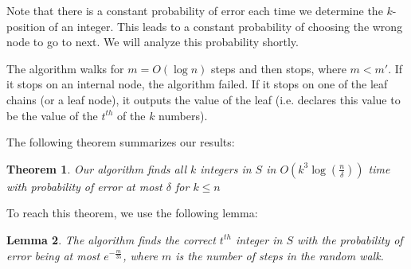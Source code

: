 \documentclass[12pt]{article}
\newtheorem{theorem}{Theorem}
\newtheorem{lemma}[theorem]{Lemma}
\begin{document}
Note that there is a constant probability of error each time we determine the $k$-position of an integer. This leads to a constant probability of choosing the wrong node to go to next. We will analyze this probability shortly. 

The algorithm walks for $m=O(\log{n})$ steps and then stops, where $m < m'$. If it stops on an internal node, the algorithm failed. If it stops on one of the leaf chains (or a leaf node), it outputs the value of the leaf (i.e. declares this value to be the value of the $t^{th}$ of the $k$ numbers). 

The following theorem summarizes our results:

\begin{theorem} \label{thm:algrunningtime}
Our algorithm finds all $k$ integers in $S$ in $O\left(k^3\log{\left(\frac{n}{\delta}\right)}\right)$ time with probability of error at most $\delta$ for $k \leq n$
\end{theorem}

To reach this theorem, we use the following lemma:

\begin{lemma} \label{lem:algcorrectness}
The algorithm finds the correct $t^{th}$ integer in $S$ with the probability of error being at most $e^{-\frac{m}{35}}$, where $m$ is the number of steps in the random walk.
\end{lemma}
\end{document}
